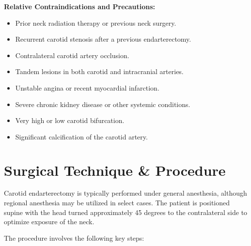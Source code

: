 \textbf{Relative Contraindications and Precautions:}
\begin{itemize}
  \item Prior neck radiation therapy or previous neck surgery.
  \item Recurrent carotid stenosis after a previous endarterectomy.
  \item Contralateral carotid artery occlusion.
  \item Tandem lesions in both carotid and intracranial arteries.
  \item Unstable angina or recent myocardial infarction.
  \item Severe chronic kidney disease or other systemic conditions.
  \item Very high or low carotid bifurcation.
  \item Significant calcification of the carotid artery.
\end{itemize}

\section*{Surgical Technique \& Procedure}
Carotid endarterectomy is typically performed under general anesthesia, although regional anesthesia may be utilized in select cases. The patient is positioned supine with the head turned approximately 45 degrees to the contralateral side to optimize exposure of the neck.

The procedure involves the following key steps:

